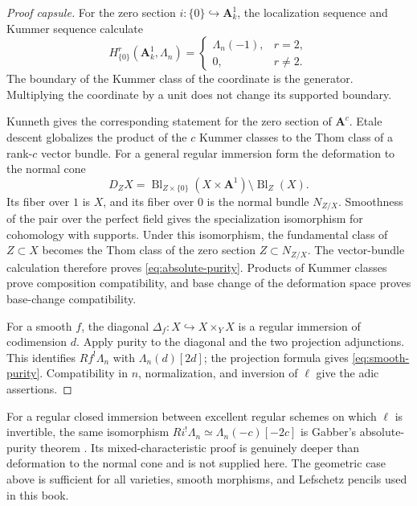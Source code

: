 \begin{proof}[Proof capsule]
For the zero section \(i:\{0\}\hookrightarrow\mathbf A^1_k\), the localization
sequence and Kummer sequence calculate
\[
 H^r_{\{0\}}(\mathbf A^1_k,\Lambda_n)=
 \begin{cases}
 \Lambda_n(-1),&r=2,\\
 0,&r\ne2.
 \end{cases}
\tag{7.4}\label{eq:purity-line}
\]
The boundary of the Kummer class of the coordinate is the generator.
Multiplying the coordinate by a unit does not change its supported boundary.

Kunneth gives the corresponding statement for the zero section of
\(\mathbf A^c\).  Etale descent globalizes the product of the \(c\) Kummer
classes to the Thom class of a rank-\(c\) vector bundle.  For a general
regular immersion form the deformation to the normal cone
\[
 D_ZX=
 \operatorname{Bl}_{Z\times\{0\}}(X\times\mathbf A^1)
 \setminus \operatorname{Bl}_{Z}(X).
\]
Its fiber over \(1\) is \(X\), and its fiber over \(0\) is the normal bundle
\(N_{Z/X}\).  Smoothness of the pair over the perfect field gives the
specialization isomorphism for cohomology with supports.  Under this
isomorphism, the fundamental class of \(Z\subset X\) becomes the Thom class
of the zero section \(Z\subset N_{Z/X}\).  The vector-bundle calculation
therefore proves \eqref{eq:absolute-purity}.  Products of Kummer classes prove
composition compatibility, and base change of the deformation space proves
base-change compatibility.

For a smooth \(f\), the diagonal
\(\Delta_f:X\hookrightarrow X\times_YX\) is a regular immersion of
codimension \(d\).  Apply purity to the diagonal and the two projection
adjunctions.  This identifies \(Rf^!\Lambda_n\) with
\(\Lambda_n(d)[2d]\); the projection formula gives
\eqref{eq:smooth-purity}.  Compatibility in \(n\), normalization, and
inversion of \(\ell\) give the adic assertions.
\end{proof}

\begin{remark}
For a regular closed immersion between excellent regular schemes on which
\(\ell\) is invertible, the same isomorphism
\(Ri^!\Lambda_n\simeq\Lambda_n(-c)[-2c]\) is Gabber's absolute-purity theorem
\cite{SGA4half}.  Its mixed-characteristic proof is genuinely
deeper than deformation to the normal cone and is not supplied here.  The
geometric case above is sufficient for all varieties, smooth morphisms, and
Lefschetz pencils used in this book.
\end{remark}

